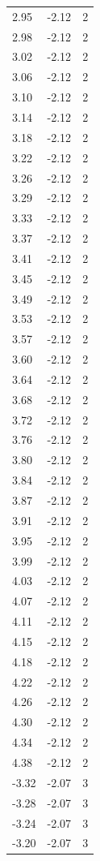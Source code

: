 \begin{longtable}{lrr}
  2.95 & -2.12 & 2 \\
  2.98 & -2.12 & 2 \\
  3.02 & -2.12 & 2 \\
  3.06 & -2.12 & 2 \\
  3.10 & -2.12 & 2 \\
  3.14 & -2.12 & 2 \\
  3.18 & -2.12 & 2 \\
  3.22 & -2.12 & 2 \\
  3.26 & -2.12 & 2 \\
  3.29 & -2.12 & 2 \\
  3.33 & -2.12 & 2 \\
  3.37 & -2.12 & 2 \\
  3.41 & -2.12 & 2 \\
  3.45 & -2.12 & 2 \\
  3.49 & -2.12 & 2 \\
  3.53 & -2.12 & 2 \\
  3.57 & -2.12 & 2 \\
  3.60 & -2.12 & 2 \\
  3.64 & -2.12 & 2 \\
  3.68 & -2.12 & 2 \\
  3.72 & -2.12 & 2 \\
  3.76 & -2.12 & 2 \\
  3.80 & -2.12 & 2 \\
  3.84 & -2.12 & 2 \\
  3.87 & -2.12 & 2 \\
  3.91 & -2.12 & 2 \\
  3.95 & -2.12 & 2 \\
  3.99 & -2.12 & 2 \\
  4.03 & -2.12 & 2 \\
  4.07 & -2.12 & 2 \\
  4.11 & -2.12 & 2 \\
  4.15 & -2.12 & 2 \\
  4.18 & -2.12 & 2 \\
  4.22 & -2.12 & 2 \\
  4.26 & -2.12 & 2 \\
  4.30 & -2.12 & 2 \\
  4.34 & -2.12 & 2 \\
  4.38 & -2.12 & 2 \\
  -3.32 & -2.07 & 3 \\
  -3.28 & -2.07 & 3 \\
  -3.24 & -2.07 & 3 \\
  -3.20 & -2.07 & 3 \\

\end{longtable}
